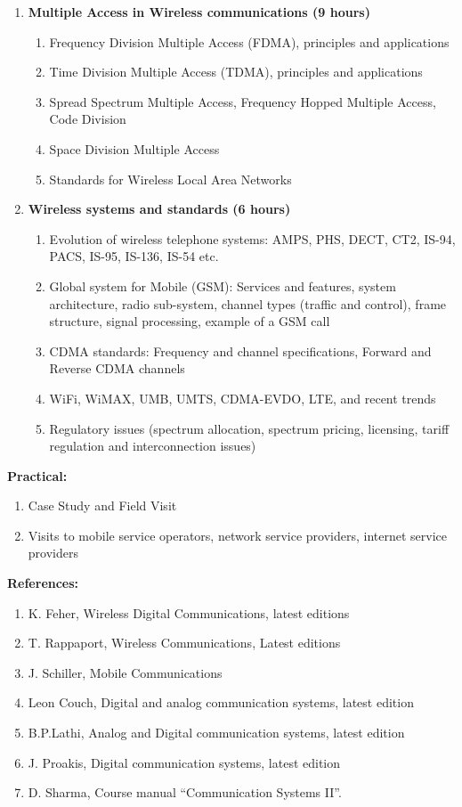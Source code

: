 \begin{enumerate}
  \item \textbf{Multiple Access in Wireless communications \hfill (9 hours)}
    \begin{enumerate}
      \item Frequency Division Multiple Access (FDMA), principles and  applications
      \item Time Division Multiple Access (TDMA), principles and applications
      \item Spread Spectrum Multiple Access, Frequency Hopped Multiple Access, Code Division
      \item Space Division Multiple Access
      \item Standards for Wireless Local Area Networks
    \end{enumerate}
    \vs

  \item \textbf{Wireless systems and standards \hfill (6 hours)}
    \begin{enumerate}
      \item Evolution of wireless telephone systems: AMPS, PHS, DECT, CT2, IS-94, PACS, IS-95, IS-136, IS-54 etc.
      \item Global system for Mobile (GSM): Services and features, system architecture, radio sub-system, channel types (traffic and control), frame structure, signal processing, example of a GSM call
      \item CDMA standards: Frequency and channel specifications, Forward and Reverse CDMA channels
      \item WiFi, WiMAX, UMB, UMTS, CDMA-EVDO, LTE, and recent trends
      \item Regulatory issues (spectrum allocation, spectrum pricing, licensing, tariff  regulation and interconnection issues)
    \end{enumerate}
    \vs
\end{enumerate}
\Vs

\noindent \textbf{Practical:}
  \begin{enumerate}[label=\arabic*.]
    \item Case Study and Field Visit
    \item Visits to mobile service operators, network service providers, internet service providers
  \end{enumerate}
\Vs

\noindent \textbf{References:}
  \begin{enumerate}[label=\arabic*.]
    \item K. Feher,  Wireless Digital Communications, latest editions
    \item T. Rappaport, Wireless Communications, Latest editions
    \item J. Schiller, Mobile Communications
    \item Leon Couch, Digital and analog communication systems, latest edition
    \item B.P.Lathi, Analog  and Digital communication systems, latest edition
    \item J. Proakis, Digital communication systems, latest edition
    \item D. Sharma, Course manual “Communication Systems II”.  
  \end{enumerate}

\newpage

